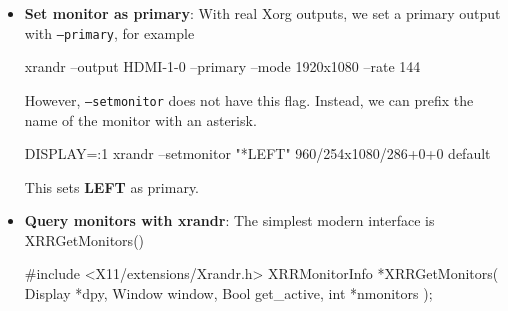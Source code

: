 \documentclass{report}
\begin{document}
\begin{itemize}
\begin{bashcode}
                DISPLAY=:1 xrandr \
                    --setmonitor RIGHT 960/254x1080/286+960+0 none
            \end{bashcode}
            \bigbreak \noindent 
            There is one root window and one continuous coordinate system.
            \begin{verbatim}
                Xephyr window / X screen / root window
                1920 x 1080
                +----------------------+----------------------+
                |                      |                      |
                |       LEFT           |       RIGHT          |
                |     960x1080         |      960x1080        |
                |                      |                      |
                | x=0..959             | x=960..1919          |
                |                      |                      |
                +----------------------+----------------------+
            \end{verbatim}
            \bigbreak \noindent 
            This is excellent for testing monitor geometry, window placement, focus movement, monitor selection, etc., but it does not fully simulate output hotplug or two independent physical RandR outputs.
            \bigbreak \noindent 
            \textbf{Note}: \texttt{none} means there is no RandR output backing that logical monitor.
        \item \textbf{Set monitor as primary}: With real Xorg outputs, we set a primary output with \texttt{\texttt{--}primary}, for example
            \bigbreak \noindent 
            \begin{bashcode}
            xrandr --output HDMI-1-0 --primary --mode 1920x1080 --rate 144
            \end{bashcode}
            \bigbreak \noindent 
            However, \texttt{\texttt{--}setmonitor} does not have this flag. Instead, we can prefix the name of the monitor with an asterisk.
            \bigbreak \noindent 
            \begin{bashcode}
            DISPLAY=:1 xrandr --setmonitor "*LEFT" 960/254x1080/286+0+0 default
            \end{bashcode}
            \bigbreak \noindent 
            This sets \textbf{LEFT} as primary.
            
        \item \textbf{Query monitors with xrandr}: The simplest modern interface is XRRGetMonitors()
            \bigbreak \noindent 
            \begin{cppcode}
            #include <X11/extensions/Xrandr.h>
            XRRMonitorInfo *XRRGetMonitors(
                Display *dpy,
                Window window,
                Bool get_active,
                int *nmonitors
            );


\end{cppcode}
\end{itemize}
\end{document}
